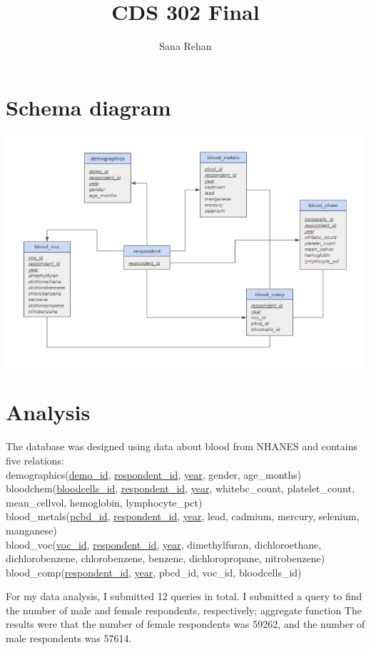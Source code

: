\documentclass[]{article}
\title{CDS 302 Final}
\author{Sana Rehan}
\begin{document}
\maketitle
\section{Schema diagram} 
\includegraphics[scale=0.75]{relationaldiagram.png}

\section{Analysis}
The database was designed using data about blood from NHANES and contains five relations: \\
demographics(\underline{demo\_id}, \underline{respondent\_id}, \underline{year}, gender, age\_months) \\
bloodchem(\underline{bloodcells\_id}, \underline{respondent\_id}, \underline{year}, whitebc\_count, platelet\_count, mean\_cellvol, hemoglobin, lymphocyte\_pct) \\
blood\_metals(\underline{pcbd\_id}, \underline{respondent\_id}, \underline{year}, lead, cadmium, mercury, selenium, manganese) \\
blood\_voc(\underline{voc\_id}, \underline{respondent\_id}, \underline{year}, dimethylfuran, dichloroethane, dichlorobenzene, chlorobenzene, benzene, dichloropropane, nitrobenzene) \\
blood\_comp(\underline{respondent\_id}, \underline{year}, pbcd\_id, voc\_id, bloodcells\_id)

For my data analysis, I submitted 12 queries in total. 
I submitted a query to find the number of male and female respondents, respectively; aggregate function
The results were that the number of female respondents was 59262, and the number of male respondents was 57614. 
\end{document}
